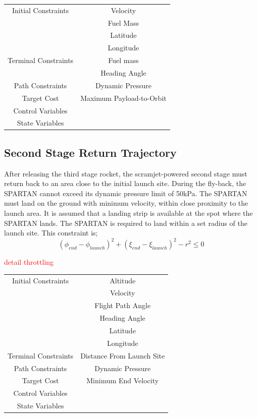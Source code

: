 \begin{tabular}{|c|c|}
	\hline Initial Constraints  & Velocity \\ & Fuel Mass  \\ & Latitude \\ & Longitude \\ 
	\hline Terminal Constraints & Fuel mass \\ & Heading Angle \\ 
	\hline Path Constraints & Dynamic Pressure \\ 
	\hline Target Cost & Maximum Payload-to-Orbit \\ 
			\hline Control Variables &  \\ 
			\hline State Variables &  \\ 
	\hline 
\end{tabular} 



\subsection{Second Stage Return Trajectory}
After releasing the third stage rocket, the scramjet-powered second stage must return back to an area close to the initial launch site.
During the fly-back, the SPARTAN cannot exceed its dynamic pressure limit of 50kPa. 
The SPARTAN must land on the ground with minimum velocity, within close proximity to the launch area. It is assumed that a landing strip is available at the spot where the SPARTAN lands. The SPARTAN is required to land within a set radius of the launch site. This constraint is;
\begin{equation}
(\phi_{end} - \phi_{launch})^2 + (\xi_{end} - \xi_{launch})^2 - r^2 \leq 0
\end{equation}

\textcolor{red}{detail throttling}


\begin{tabular}{|c|c|}
	\hline Initial Constraints  & Altitude \\ & Velocity\\ & Flight Path Angle\\ & Heading Angle\\ & Latitude\\ & Longitude\\ 
	\hline Terminal Constraints &  Distance From Launch Site \\ 
	\hline Path Constraints & Dynamic Pressure \\ 
	\hline Target Cost & Minimum End Velocity \\ 
				\hline Control Variables &  \\ 
				\hline State Variables &  \\ 
	\hline 
\end{tabular} 




